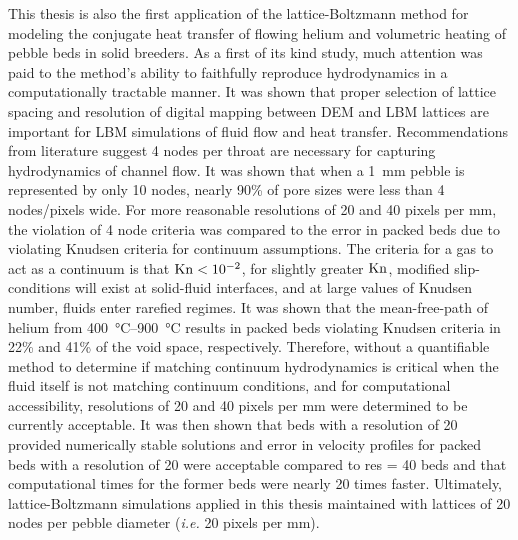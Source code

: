 This thesis is also the first application of the lattice-Boltzmann method for modeling the conjugate heat transfer of flowing helium and volumetric heating of pebble beds in solid breeders. As a first of its kind study, much attention was paid to the method's ability to faithfully reproduce hydrodynamics in a computationally tractable manner. It was shown that proper selection of lattice spacing and resolution of digital mapping between DEM and LBM lattices are important for LBM simulations of fluid flow and heat transfer. Recommendations from literature suggest 4 nodes per throat are necessary for capturing hydrodynamics of channel flow. It was shown that when a \SI{1}{\milli\meter} pebble is represented by only 10 nodes, nearly 90\% of pore sizes were less than 4 nodes/pixels wide. For more reasonable resolutions of 20 and 40 pixels per \si{\milli\meter}, the violation of 4 node criteria was compared to the error in packed beds due to violating Knudsen criteria for continuum assumptions. The criteria for a gas to act as a continuum is that $\mathrm{Kn} < 10^{-2}$, for slightly greater $\mathrm{Kn}$, modified slip-conditions will exist at solid-fluid interfaces, and at large values of Knudsen number, fluids enter rarefied regimes. It was shown that the mean-free-path of helium from \SIrange{400}{900}{\celsius} results in packed beds violating Knudsen criteria in 22\% and 41\% of the void space, respectively. Therefore, without a quantifiable method to determine if matching continuum hydrodynamics is critical when the fluid itself is not matching continuum conditions, and for computational accessibility, resolutions of 20 and 40 pixels per \si{\milli\meter} were determined to be currently acceptable. It was then shown that beds with a resolution of 20 provided numerically stable solutions and error in velocity profiles for packed beds with a resolution of 20 were acceptable compared to res = 40 beds and that computational times for the former beds were nearly 20 times faster. Ultimately, lattice-Boltzmann simulations applied in this thesis maintained with lattices of 20 nodes per pebble diameter (\textit{i.e.} 20 pixels per \si{\milli\meter}).

